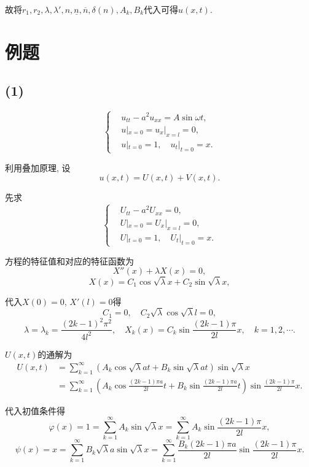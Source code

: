\documentclass[11pt,a4paper]{article}
\begin{document}
故将$r_1,r_2,\lambda,\lambda',n,\underline{n},\overline{n},\delta(n),A_k,B_k$代入可得$u(x,t)$.

\section*{例题}

\subsection*{(1)}

\begin{problem}
$$
  \left\{\begin{aligned}
     & u_{tt}-a^2u_{xx}=A\sin\omega t, \\
     & u|_{x=0}=u_x|_{x=l}=0,          \\
     & u|_{t=0}=1,\quad u_t|_{t=0}=x.
  \end{aligned}\right.
$$
\end{problem}

利用叠加原理, 设$$u(x,t)=U(x,t)+V(x,t).$$

先求
$$
  \left\{\begin{aligned}
     & U_{tt}-a^2U_{xx}=0,            \\
     & U|_{x=0}=U_x|_{x=l}=0,         \\
     & U|_{t=0}=1,\quad U_t|_{t=0}=x.
  \end{aligned}\right.
$$

方程的特征值和对应的特征函数为
$$X''(x)+\lambda X(x)=0,$$
$$X(x)=C_1\cos\sqrt{\lambda}x+C_2\sin\sqrt{\lambda}x,$$

代入$X(0)=0$, $X'(l)=0$得
$$C_1=0,\quad C_2\sqrt{\lambda}\cos\sqrt{\lambda}l=0,$$
$$\lambda=\lambda_k=\frac{(2k-1)^2\pi^2}{4l^2},\quad X_k(x)=C_k\sin\frac{(2k-1)\pi}{2l}x,\quad k=1,2,\cdots.$$

$U(x,t)$的通解为
\begin{align*}
  U(x,t)
   & =\sum_{k=1}^\infty\left(A_k\cos\sqrt{\lambda}at+
  B_k\sin\sqrt{\lambda}at\right)\sin\sqrt{\lambda}x          \\
   & =\sum_{k=1}^\infty\left(A_k\cos\frac{(2k-1)\pi a}{2l}t+
  B_k\sin\frac{(2k-1)\pi a}{2l}t\right)\sin\frac{(2k-1)\pi}{2l}x.
\end{align*}

代入初值条件得
$$\varphi(x)=1=\sum_{k=1}^\infty A_k\sin\sqrt{\lambda}x=\sum_{k=1}^\infty A_k\sin\frac{(2k-1)\pi }{2l}x,$$
$$\psi(x)=x=\sum_{k=1}^\infty B_k\sqrt{\lambda}a\sin\sqrt{\lambda}x=\sum_{k=1}^\infty \frac{B_k(2k-1)\pi a}{2l}\sin\frac{(2k-1)\pi}{2l}x.$$
\end{document}
